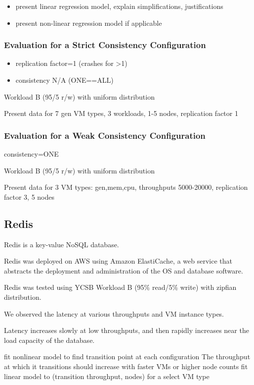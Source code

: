 \documentclass{acm_proc_article-sp}
\begin{document}
\begin{itemize}
   \item present linear regression model, explain simplifications, justifications
   \item present non-linear regression model if applicable
\end{itemize}

\subsubsection{Evaluation for a Strict Consistency Configuration}

\begin{itemize}
\item replication factor=1 (crashes for >1)
\item consistency N/A (ONE==ALL)
\end{itemize}
Workload B (95/5 r/w) with uniform distribution

Present data for
7 gen VM types, 3 workloads, 1-5 nodes, replication factor 1

\subsubsection{Evaluation for a Weak Consistency Configuration}

consistency=ONE

Workload B (95/5 r/w) with uniform distribution

Present data for
3 VM types: gen,mem,cpu, throughputs 5000-20000, replication factor 3, 5 nodes

\subsection{Redis}

Redis is a key-value NoSQL database.

Redis was deployed on AWS using Amazon ElastiCache, a web service that abstracts the deployment and administration of the OS and database software.

Redis was tested using YCSB Workload B (95\% read/5\% write) with zipfian distribution.

We observed the latency at various throughputs and VM instance types.

Latency increases slowly at low throughputs, and then rapidly increases near the load capacity of the database.

fit nonlinear model to find transition point at each configuration
The throughput at which it transitions should increase with faster VMs or higher node counts  
fit linear model to (transition throughput, nodes) for a select VM type
\end{document}
